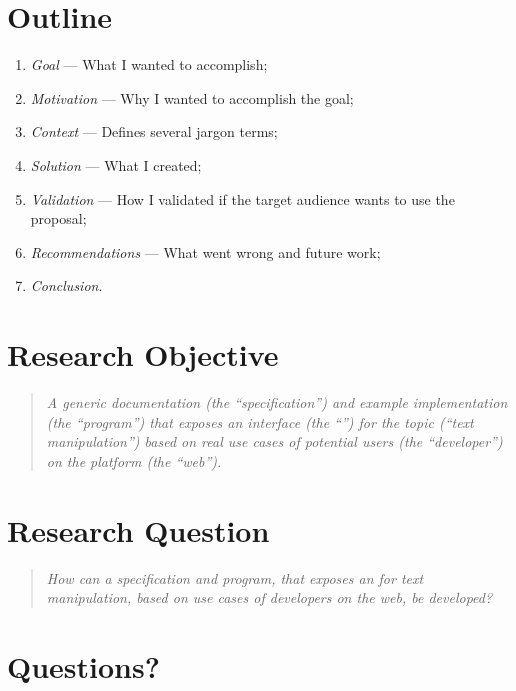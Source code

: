 \begingroup
\let\clearpage\relax
\let\cleardoublepage\relax
\let\cleardoublepage\relax

\section*{Outline}

\begin{enumerate}
\item \emph{Goal} --- What I wanted to accomplish;
\item \emph{Motivation} --- Why I wanted to accomplish the goal;
\item \emph{Context} --- Defines several jargon terms;
\item \emph{Solution} --- What I created;
\item \emph{Validation} --- How I validated if the target audience wants to
  use the proposal;
\item \emph{Recommendations} --- What went wrong and future work;
\item \emph{Conclusion}.
\end{enumerate}

\section*{Research Objective}

\begin{quote}
  \textit{A generic documentation (the ``specification'') and example
    implementation (the ``program'') that exposes an interface (the
    ``'') for the topic (``text manipulation'') based on real
    use cases of potential users (the ``developer'') on the platform (the
    ``web'').
  }
\end{quote}

\section*{Research Question}

\begin{quote}
  \textit{How can a specification and program, that exposes an
     for text manipulation, based on use cases of
    developers on the web, be developed?
  }
\end{quote}

\vspace{5mm}
\section*{Questions?}

\endgroup